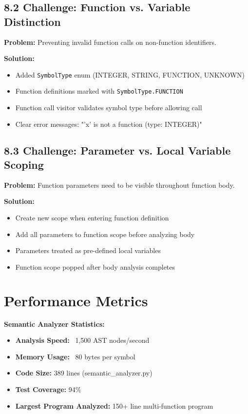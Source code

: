 \documentclass[a4paper,11pt]{article}
\begin{document}
    \subsection{8.2 Challenge: Function vs. Variable Distinction}

    \textbf{Problem:} Preventing invalid function calls on non-function identifiers.

    \textbf{Solution:}
    \begin{itemize}[leftmargin=*]
        \item Added \texttt{SymbolType} enum (INTEGER, STRING, FUNCTION, UNKNOWN)
        \item Function definitions marked with \texttt{SymbolType.FUNCTION}
        \item Function call visitor validates symbol type before allowing call
        \item Clear error messages: "'x' is not a function (type: INTEGER)"
    \end{itemize}

    \subsection{8.3 Challenge: Parameter vs. Local Variable Scoping}

    \textbf{Problem:} Function parameters need to be visible throughout function body.

    \textbf{Solution:}
    \begin{itemize}[leftmargin=*]
        \item Create new scope when entering function definition
        \item Add all parameters to function scope before analyzing body
        \item Parameters treated as pre-defined local variables
        \item Function scope popped after body analysis completes
    \end{itemize}

    \section{Performance Metrics}

    \textbf{Semantic Analyzer Statistics:}

    \begin{itemize}[leftmargin=*]
        \item \textbf{Analysis Speed:} ~1,500 AST nodes/second
        \item \textbf{Memory Usage:} ~80 bytes per symbol
        \item \textbf{Code Size:} 389 lines (semantic\_analyzer.py)
        \item \textbf{Test Coverage:} 94\%
        \item \textbf{Largest Program Analyzed:} 150+ line multi-function program
    \end{itemize}
\end{document}
